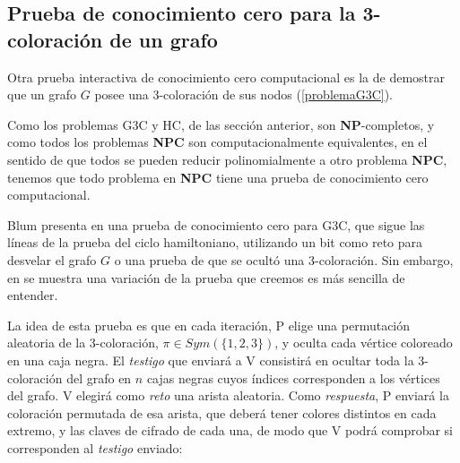 \subsection{Prueba de conocimiento cero para la 3-coloración de un grafo}

Otra prueba interactiva de conocimiento cero computacional es la de demostrar que un grafo $G$ posee una 3-coloración de sus nodos (\autoref{problemaG3C}).

Como los problemas G3C y HC, de las sección anterior, son \textbf{NP}-completos, y como todos los problemas \textbf{NPC} son computacionalmente equivalentes, en el sentido de que todos se pueden reducir polinomialmente a otro problema \textbf{NPC}, tenemos que todo problema en \textbf{NPC} tiene una prueba de conocimiento cero computacional.


Blum presenta en \citep{blum} una prueba de conocimiento cero para G3C, que sigue las líneas de la prueba del ciclo hamiltoniano, utilizando un bit como reto para desvelar el grafo $G$ o una prueba de que se ocultó una 3-coloración. Sin embargo, en \citep{pieprzyk2013fundamentals} se muestra una variación de la prueba que creemos es más sencilla de entender.

La idea de esta prueba es que en cada iteración, P elige una permutación aleatoria de la 3-coloración, $\pi \in Sym(\{1,2,3\})$, y oculta cada vértice coloreado en una caja negra. El \textit{testigo} que enviará a V consistirá en ocultar toda la 3-coloración del grafo en $n$ cajas negras cuyos índices corresponden a los vértices del grafo. V elegirá como \textit{reto} una arista aleatoria. Como \textit{respuesta}, P enviará la coloración permutada de esa arista, que deberá tener colores distintos en cada extremo, y las claves de cifrado de cada una, de modo que V podrá comprobar si corresponden al \textit{testigo} enviado:

\hfil

